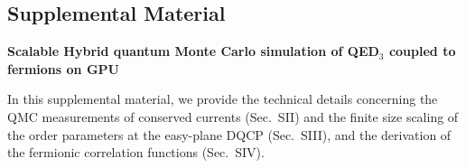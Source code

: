\documentclass[aps,prl,twocolumn,superscriptaddress,showpacs,longbibliography]{revtex4-2}
\begin{document}
\begin{widetext}
\section*{Supplemental Material}

\centerline{\bf Scalable Hybrid quantum Monte Carlo simulation of QED$_3$ coupled to fermions on GPU}
	\vskip3mm

	\centerline{}

	\vskip6mm

In this supplemental material, we provide the technical details concerning the QMC measurements of conserved currents (Sec.~SII) and the finite size scaling of the order parameters at the easy-plane DQCP (Sec.~SIII), and the derivation of the fermionic correlation functions (Sec.~SIV).



\end{widetext}
\end{document}
